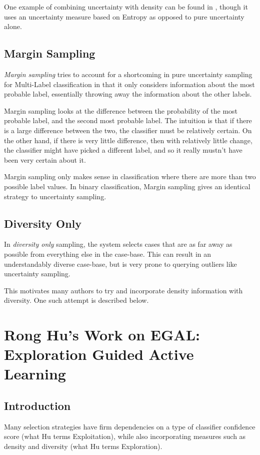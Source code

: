 \documentclass[a4paper,11pt]{report}
\begin{document}
One example of combining uncertainty with density can be found in \citet{Zhu2008}, though it uses an uncertainty measure based on Entropy as opposed to pure uncertainty alone.

\subsection{Margin Sampling}

\emph{Margin sampling} tries to account for a shortcoming in pure uncertainty sampling for Multi-Label classification in that it only considers information about the most probable label, essentially throwing away the information about the other labels.

Margin sampling looks at the difference between the probability of the most probable label, and the second most probable label. The intuition is that if there is a large difference between the two, the classifier must be relatively certain. On the other hand, if there is very little difference, then with relatively little change, the classifier might have picked a different label, and so it really mustn't have been very certain about it.

Margin sampling only makes sense in classification where there are more than two possible label values. In binary classification, Margin sampling gives an identical strategy to uncertainty sampling.

\subsection{Diversity Only}
In \emph{diversity only} sampling, the system selects cases that are as far away as possible from everything else in the case-base. This can result in an understandably diverse case-base, but is very prone to querying outliers like uncertainty sampling.

This motivates many authors to try and incorporate density information with diversity. One such attempt is described below.

\section{Rong Hu's Work on EGAL: Exploration Guided Active Learning}
\subsection{Introduction}
Many selection strategies have firm dependencies on a type of classifier confidence score (what Hu terms Exploitation), while also incorporating measures such as density and diversity (what Hu terms Exploration).
\end{document}
